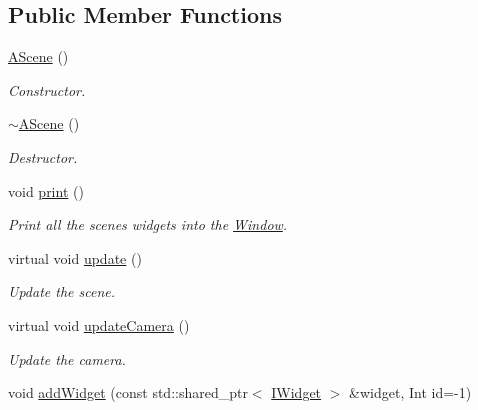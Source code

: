 \subsection*{Public Member Functions}
\begin{DoxyCompactItemize}
\item 
\mbox{\label{classAScene_ad0eacf691dbc8240fdf3a42d450c1042}} 
\hyperlink{classAScene_ad0eacf691dbc8240fdf3a42d450c1042}{A\+Scene} ()
\begin{DoxyCompactList}\small\item\em Constructor. \end{DoxyCompactList}\item 
\mbox{\label{classAScene_a9faf7f1a271327227e83627432d0b210}} 
\hyperlink{classAScene_a9faf7f1a271327227e83627432d0b210}{$\sim$\+A\+Scene} ()
\begin{DoxyCompactList}\small\item\em Destructor. \end{DoxyCompactList}\item 
\mbox{\label{classAScene_a0170b6a47bb2cc189bfacb432a0b4332}} 
void \hyperlink{classAScene_a0170b6a47bb2cc189bfacb432a0b4332}{print} ()
\begin{DoxyCompactList}\small\item\em Print all the scene\textquotesingle{}s widgets into the \hyperlink{classWindow}{Window}. \end{DoxyCompactList}\item 
\mbox{\label{classAScene_a5f13212b503601ef58b8387b36c5796c}} 
virtual void \hyperlink{classAScene_a5f13212b503601ef58b8387b36c5796c}{update} ()
\begin{DoxyCompactList}\small\item\em Update the scene. \end{DoxyCompactList}\item 
\mbox{\label{classAScene_a3d7821a7bff4304027e22b27bebf4088}} 
virtual void \hyperlink{classAScene_a3d7821a7bff4304027e22b27bebf4088}{update\+Camera} ()
\begin{DoxyCompactList}\small\item\em Update the camera. \end{DoxyCompactList}\item 
void \hyperlink{classAScene_aa711b6068dd8dee262160eedfd96ad02}{add\+Widget} (const std\+::shared\+\_\+ptr$<$ \hyperlink{classIWidget}{I\+Widget} $>$ \&widget, Int id=-\/1)

\end{DoxyCompactItemize}
